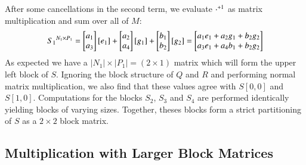 After some cancellations in the second term, we evaluate $\cdot^{+1}$ as matrix multiplication and sum over all of $M$:
\begin{equation*}
	{S_1}^{N_1 \times P_1} =
			\begin{bmatrix}\vphantom{b}a_1 \\ \vphantom{b}a_3 \end{bmatrix}
			[e_1]
		+ 	\begin{bmatrix}\vphantom{b}a_2 \\ \vphantom{b}a_4 \end{bmatrix}
			[g_1]
		+	\begin{bmatrix} b_1 \\ b_2 \end{bmatrix}
			[ g_2 ]
		=  \begin{bmatrix}a_1e_1+a_2g_1+b_2g_2\\ a_3e_1+a_4b_1+b_2g_2\end{bmatrix}
\end{equation*}
As expected we have a $|N_1| \times |P_1| = (2 \times 1)$ matrix which will form the upper left block of $S$.
Ignoring the block structure of $Q$ and $R$ and performing normal matrix multiplication, we also find that these values 
agree with $S[0,0]$ and $S[1,0]$.
Computations for the blocks $S_2$, $S_3$ and $S_4$ are performed identically yielding blocks of varying sizes.
Together, theses blocks form a strict partitioning of $S$ as a $2\times 2$ block matrix.







\subsection{Multiplication with Larger Block Matrices}

